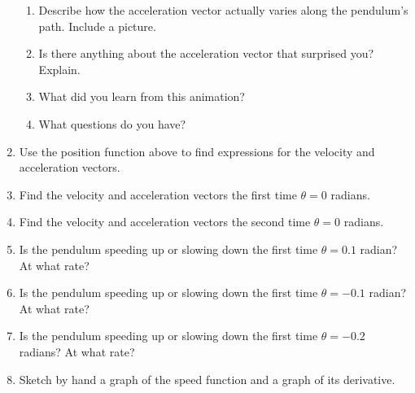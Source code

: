 \documentclass{ximera}
\begin{document}
\begin{question}
\begin{enumerate}
\begin{enumerate}
\item Describe how the acceleration vector actually varies along the pendulum's path. Include a picture.

\item Is there anything about the acceleration vector that surprised you? Explain.

\item What did you learn from this animation?

\item What questions do you have?
\end{enumerate}

\begin{freeResponse}
\end{freeResponse}

\item Use the position function above to find expressions for the velocity and acceleration vectors.

\item Find the velocity and acceleration vectors the first time $\theta = 0$ radians.

\item  Find the velocity and acceleration vectors the second time $\theta = 0$ radians.

\item Is the pendulum speeding up or slowing down the first time $\theta = 0.1$ radian? At what rate? 

\item Is the pendulum speeding up or slowing down the first time $\theta = -0.1$ radian? At what rate?

\item Is the pendulum speeding up or slowing down the first time $\theta = -0.2$ radians? At what rate? 

\item Sketch by hand a graph of the speed function and a graph of its derivative. 

\end{enumerate}


\end{question}
\end{document}
